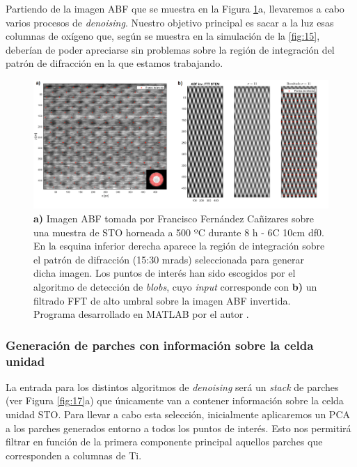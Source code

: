 Partiendo de la imagen ABF que se muestra en la Figura \ref{fig:16}a, llevaremos a cabo varios procesos de \textit{denoising}. Nuestro objetivo principal es sacar a la luz esas columnas de oxígeno que, según se muestra en la simulación de la \autoref{fig:15}, deberían de poder apreciarse sin problemas sobre la región de integración del patrón de difracción en la que estamos trabajando.

\newpage
\begin{figure}[h!]
    \centering
    \includegraphics[width=1\textwidth]{fig/Fig16.png}
    \caption{\textbf{a)} Imagen ABF tomada por Francisco Fernández Cañizares sobre una muestra de STO horneada a 500 ºC durante 8 h - 6C 10cm df0. En la esquina inferior derecha aparece la región de integración sobre el patrón de difracción (15:30 mrads) seleccionada para generar dicha imagen. Los puntos de interés han sido escogidos por el algoritmo de detección de \textit{blobs}, cuyo \textit{input} corresponde con \textbf{b)} un filtrado FFT de alto umbral sobre la imagen ABF invertida. Programa desarrollado en MATLAB por el autor \cite{repo}.}
    \label{fig:16}
\end{figure}

\subsubsection{Generación de parches con información sobre la celda unidad}

La entrada para los distintos algoritmos de \textit{denoising} será un \textit{stack} de parches (ver Figura \ref{fig:17}a) que únicamente van a contener información sobre la celda unidad STO. Para llevar a cabo esta selección, inicialmente aplicaremos un PCA a los parches generados entorno a todos los puntos de interés. Esto nos permitirá filtrar en función de la primera componente principal aquellos parches que corresponden a columnas de Ti.\\


